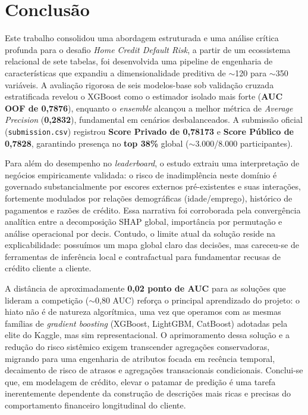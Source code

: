 \documentclass[10pt,a4paper]{article}
\begin{document}
\section{Conclusão}
Este trabalho consolidou uma abordagem estruturada e uma análise crítica profunda para o desafio \textit{Home Credit Default Risk}, a partir de um ecossistema relacional de sete tabelas, foi desenvolvida uma pipeline de engenharia de características que expandiu a dimensionalidade preditiva de $\sim$120 para $\sim$350 variáveis. A avaliação rigorosa de seis modelos-base sob validação cruzada estratificada revelou o XGBoost como o estimador isolado mais forte (\textbf{AUC OOF de 0,7876}), enquanto o \textit{ensemble} alcançou a melhor métrica de \textit{Average Precision} (\textbf{0,2832}), fundamental em cenários desbalanceados. A submissão oficial (\texttt{submission.csv}) registrou \textbf{Score Privado de 0,78173} e \textbf{Score Público de 0,7828}, garantindo presença no \textbf{top 38\%} global ($\sim$3.000/8.000 participantes).

Para além do desempenho no \textit{leaderboard}, o estudo extraiu uma interpretação de negócios empiricamente validada: o risco de inadimplência neste domínio é governado substancialmente por escores externos pré-existentes e suas interações, fortemente modulados por relações demográficas (idade/emprego), histórico de pagamentos e razões de crédito. Essa narrativa foi corroborada pela convergência analítica entre a decomposição SHAP global, importância por permutação e análise operacional por decis. Contudo, o limite atual da solução reside na explicabilidade: possuímos um mapa global claro das decisões, mas careceu-se de ferramentas de inferência local e contrafactual para fundamentar recusas de crédito cliente a cliente.

A distância de aproximadamente \textbf{0,02 ponto de AUC} para as soluções que lideram a competição ($\sim$0,80 AUC) reforça o principal aprendizado do projeto: o hiato não é de natureza algorítmica, uma vez que operamos com as mesmas famílias de \textit{gradient boosting} (XGBoost, LightGBM, CatBoost) adotadas pela elite do Kaggle, mas sim representacional. O aprimoramento dessa solução e a redução do risco sistêmico exigem transcender agregações conservadoras, migrando para uma engenharia de atributos focada em recência temporal, decaimento de risco de atrasos e agregações transacionais condicionais. Conclui-se que, em modelagem de crédito, elevar o patamar de predição é uma tarefa inerentemente dependente da construção de descrições mais ricas e precisas do comportamento financeiro longitudinal do cliente.
\end{document}
